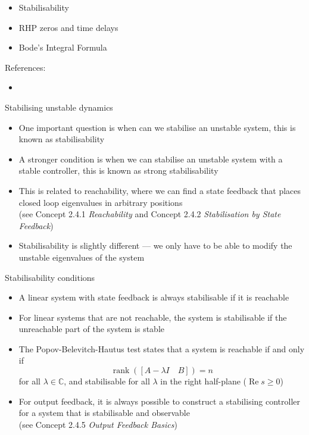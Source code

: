 \documentclass[10pt]{beamer-control}
\begin{document}

\begin{SUMMARY}
  \begin{itemize}
    \item Stabilisability
    \item RHP zeros and time delays
    \item Bode's Integral Formula
  \end{itemize}
  \vfill References:
  \begin{itemize}
    \item \astrom[§14.1 - §14.2]
  \end{itemize}
\end{SUMMARY}




\begin{frame}{Stabilising unstable dynamics}
\begin{itemize}
\item One important question is when can we stabilise an unstable system, this is known as stabilisability
\item A stronger condition is when we can stabilise an unstable system with a stable controller, this is known as strong stabilisability
\item This is related to reachability, where we can find a state feedback that places closed loop eigenvalues in arbitrary positions\\ (see Concept 2.4.1 \emph{Reachability} and Concept 2.4.2 \emph{Stabilisation by State Feedback})
\item Stabilisability is slightly different --- we only have to be able to modify the unstable eigenvalues of the system
\end{itemize}
\end{frame}

\begin{frame}{Stabilisability conditions}
  \begin{itemize}
    \item A linear system with state feedback is always stabilisable if it is reachable
    \item For linear systems that are not reachable, the system is stabilisable if the unreachable part of the system is stable
    \item The Popov-Belevitch-Hautus test states that a system is reachable if and only if
      \begin{equation}
        \operatorname{rank}([A-\lambda I \quad B]) = n
      \end{equation}
		for all $\lambda\in\mathbb{C}$, and stabilisable for all $\lambda$ in the right half-plane ($\operatorname{Re} s \geq 0$)
		\item For output feedback, it is always possible to construct a stabilising controller for a system that is stabilisable and observable\\ (see Concept 2.4.5 \emph{Output Feedback Basics})
	\end{itemize}
\end{frame}
\end{document}
